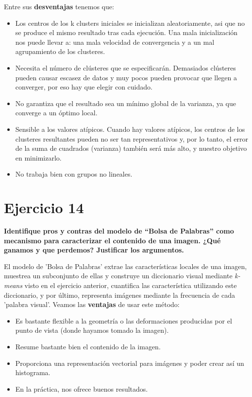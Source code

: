 \documentclass[11pt,a4paper]{article}
\begin{document}
Entre sus \textbf{desventajas} tenemos que:
\begin{itemize}
	\item Los centros de los k clusters iniciales se inicializan aleatoriamente, asi que no se produce el mismo resultado tras cada ejecución.
	Una mala inicialización	nos puede llevar a: una mala velocidad de convergencia y a un mal agrupamiento de los clusteres.
	\item Necesita el número de clústeres que se especificarán. Demasiados clústeres pueden causar escasez de datos y muy pocos pueden provocar que
	llegen a converger, por eso hay que elegir con cuidado.
	\item No garantiza que el resultado sea un mínimo global de la varianza, ya que converge a un óptimo local.
	\item Sensible a los valores atípicos. Cuando hay valores atípicos, los centros de los clusteres resultantes pueden no ser tan representativos y,
	por lo tanto, el error de la suma de cuadrados (varianza) también será más alto, y nuestro objetivo en minimizarlo.
	\item No trabaja bien con grupos no lineales.
\end{itemize}


\section*{Ejercicio 14}

\textbf{Identifique pros y contras del modelo de “Bolsa de Palabras” como mecanismo para caracterizar el contenido de una imagen. ¿Qué ganamos y
que perdemos? Justificar los argumentos.}

El modelo de 'Bolsa de Palabras' extrae las características locales de una imagen, muestrea un subconjunto de ellas y construye un diccionario
visual mediante \textit{k-means} visto en el ejercicio anterior, cuantifica las característica utilizando este diccionario, y por último, representa
imágenes mediante la frecuencia de cada 'palabra visual'. Veamos las \textbf{ventajas} de usar este método:
\begin{itemize}
	\item Es bastante flexible a la geometría o las deformaciones producidas por el punto de vista (donde hayamos tomado la imagen).
	\item Resume bastante bien el contenido de la imagen.
	\item Proporciona una representación vectorial para imágenes y poder crear así un histograma.
	\item En la práctica, nos ofrece buenos resultados.
\end{itemize}
\end{document}
